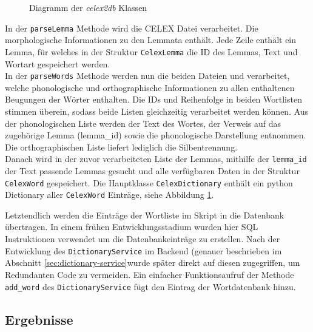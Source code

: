 \begin{figure}
	\centering
	\caption{Diagramm der \textit{celex2db} Klassen}
	\label{fig:celex2db}
\end{figure}

In der \texttt{parseLemma} Methode wird die CELEX Datei  verarbeitet. Die morphologische Informationen zu den Lemmata enthält. Jede Zeile enthält ein Lemma, für welches in der Struktur \texttt{CelexLemma} die ID des Lemmas, Text und Wortart gespeichert werden.\\

In der \texttt{parseWords} Methode werden nun die beiden Dateien  und  verarbeitet, welche phonologische und orthographische Informationen zu allen enthaltenen Beugungen der Wörter enthalten. Die IDs und Reihenfolge in beiden Wortlisten stimmen überein, sodass beide Listen gleichzeitig verarbeitet werden können. Aus der phonologischen Liste werden der Text des Wortes, der Verweis auf das zugehörige Lemma (lemma\_id) sowie die phonologische Darstellung entnommen. Die orthographischen Liste liefert lediglich die Silbentrennung.\\
Danach wird in der zuvor verarbeiteten Liste der Lemmas, mithilfe der \texttt{lemma\_id} der Text passende Lemmas gesucht und alle verfügbaren Daten in der Struktur \texttt{CelexWord} gespeichert. Die Hauptklasse \texttt{CelexDictionary} enthält ein python Dictionary aller \texttt{CelexWord} Einträge, siehe Abbildung \ref{fig:celex2db}.

Letztendlich werden die Einträge der Wortliste im Skript  in die Datenbank übertragen. In einem frühen Entwicklungsstadium wurden hier SQL Instruktionen verwendet um die Datenbankeinträge zu erstellen. Nach der Entwicklung des \texttt{DictionaryService} im Backend (genauer beschrieben im Abschnitt \ref{sec:dictionary-service}wurde später direkt auf diesen zugegriffen, um Redundanten Code zu vermeiden. Ein einfacher Funktionsaufruf der Methode \texttt{add\_word} des \texttt{DictionaryService} fügt den Eintrag der Wortdatenbank hinzu.

\subsection{Ergebnisse}
\label{sec:database-results}

